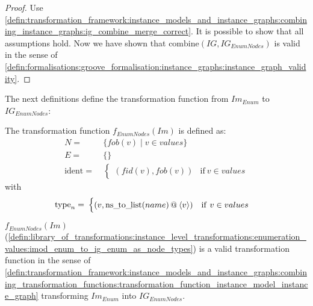 \begin{proof}
Use \cref{defin:transformation_framework:instance_models_and_instance_graphs:combining_instance_graphs:ig_combine_merge_correct}. It is possible to show that all assumptions hold. Now we have shown that $\mathrm{combine}(IG, IG_{EnumNodes})$ is valid in the sense of \cref{defin:formalisations:groove_formalisation:instance_graphs:instance_graph_validity}.
\end{proof}

The next definitions define the transformation function from $Im_{Enum}$ to $IG_{EnumNodes}$:

\begin{defin}
\label{defin:library_of_transformations:instance_level_transformations:enumeration_values:imod_enum_to_ig_enum_as_node_types}
The transformation function $f_{EnumNodes}(Im)$ is defined as:
\begin{align*}
N =\ & \{fob(v) \mid v \in values \} \\
E =\ & \{\} \\
\mathrm{ident} =\ & \begin{cases}
    (fid(v), fob(v)) & \mathrm{if }\ v \in values
\end{cases}
\end{align*}
with
\begin{align*}
\mathrm{type}_n =\ & \begin{cases}
    (v, \mathrm{ns\_\!to\_\!list}(name) \operatorname{@\:} \langle v \rangle) & \mathrm{if }\ v \in values
\end{cases}
\end{align*}
\end{defin}

\begin{thm}
\label{defin:library_of_transformations:instance_level_transformations:enumeration_values:imod_enum_to_ig_enum_as_node_types_func}
$f_{EnumNodes}(Im)$ (\cref{defin:library_of_transformations:instance_level_transformations:enumeration_values:imod_enum_to_ig_enum_as_node_types}) is a valid transformation function in the sense of \cref{defin:transformation_framework:instance_models_and_instance_graphs:combining_transformation_functions:transformation_function_instance_model_instance_graph} transforming $Im_{Enum}$ into $IG_{EnumNodes}$.
\end{thm}

